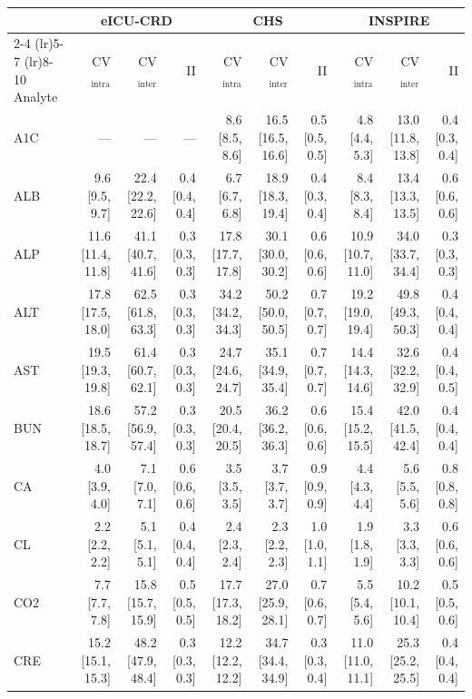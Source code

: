 \begin{table}[ht]
\centering
\tiny
\begin{tabular}{lrrrrrrrrr}
\toprule
  & \multicolumn{3}{c}{eICU-CRD} & \multicolumn{3}{c}{CHS} & \multicolumn{3}{c}{INSPIRE} \\
\cmidrule(lr){2-4} \cmidrule(lr){5-7} \cmidrule(lr){8-10}
Analyte & CV$_{\text{intra}}$ & CV$_{\text{inter}}$ & II & CV$_{\text{intra}}$ & CV$_{\text{inter}}$ & II & CV$_{\text{intra}}$ & CV$_{\text{inter}}$ & II \\
\midrule
A1C & --- & --- & --- & 8.6 [8.5, 8.6] & 16.5 [16.5, 16.6] & 0.5 [0.5, 0.5] & 4.8 [4.4, 5.3] & 13.0 [11.8, 13.8] & 0.4 [0.3, 0.4] \\
ALB & 9.6 [9.5, 9.7] & 22.4 [22.2, 22.6] & 0.4 [0.4, 0.4] & 6.7 [6.7, 6.8] & 18.9 [18.3, 19.4] & 0.4 [0.3, 0.4] & 8.4 [8.3, 8.4] & 13.4 [13.3, 13.5] & 0.6 [0.6, 0.6] \\
ALP & 11.6 [11.4, 11.8] & 41.1 [40.7, 41.6] & 0.3 [0.3, 0.3] & 17.8 [17.7, 17.8] & 30.1 [30.0, 30.2] & 0.6 [0.6, 0.6] & 10.9 [10.7, 11.0] & 34.0 [33.7, 34.4] & 0.3 [0.3, 0.3] \\
ALT & 17.8 [17.5, 18.0] & 62.5 [61.8, 63.3] & 0.3 [0.3, 0.3] & 34.2 [34.2, 34.3] & 50.2 [50.0, 50.5] & 0.7 [0.7, 0.7] & 19.2 [19.0, 19.4] & 49.8 [49.3, 50.3] & 0.4 [0.4, 0.4] \\
AST & 19.5 [19.3, 19.8] & 61.4 [60.7, 62.1] & 0.3 [0.3, 0.3] & 24.7 [24.6, 24.7] & 35.1 [34.9, 35.4] & 0.7 [0.7, 0.7] & 14.4 [14.3, 14.6] & 32.6 [32.2, 32.9] & 0.4 [0.4, 0.5] \\
BUN & 18.6 [18.5, 18.7] & 57.2 [56.9, 57.4] & 0.3 [0.3, 0.3] & 20.5 [20.4, 20.5] & 36.2 [36.2, 36.3] & 0.6 [0.6, 0.6] & 15.4 [15.2, 15.5] & 42.0 [41.5, 42.4] & 0.4 [0.4, 0.4] \\
CA & 4.0 [3.9, 4.0] & 7.1 [7.0, 7.1] & 0.6 [0.6, 0.6] & 3.5 [3.5, 3.5] & 3.7 [3.7, 3.7] & 0.9 [0.9, 0.9] & 4.4 [4.3, 4.4] & 5.6 [5.5, 5.6] & 0.8 [0.8, 0.8] \\
CL & 2.2 [2.2, 2.2] & 5.1 [5.1, 5.1] & 0.4 [0.4, 0.4] & 2.4 [2.3, 2.4] & 2.3 [2.2, 2.3] & 1.0 [1.0, 1.1] & 1.9 [1.8, 1.9] & 3.3 [3.3, 3.3] & 0.6 [0.6, 0.6] \\
CO2 & 7.7 [7.7, 7.8] & 15.8 [15.7, 15.9] & 0.5 [0.5, 0.5] & 17.7 [17.3, 18.2] & 27.0 [25.9, 28.1] & 0.7 [0.6, 0.7] & 5.5 [5.4, 5.6] & 10.2 [10.1, 10.4] & 0.5 [0.5, 0.6] \\
CRE & 15.2 [15.1, 15.3] & 48.2 [47.9, 48.4] & 0.3 [0.3, 0.3] & 12.2 [12.2, 12.2] & 34.7 [34.4, 34.9] & 0.3 [0.3, 0.4] & 11.0 [11.0, 11.1] & 25.3 [25.2, 25.5] & 0.4 [0.4, 0.4] \\

\end{tabular}
\end{table}
